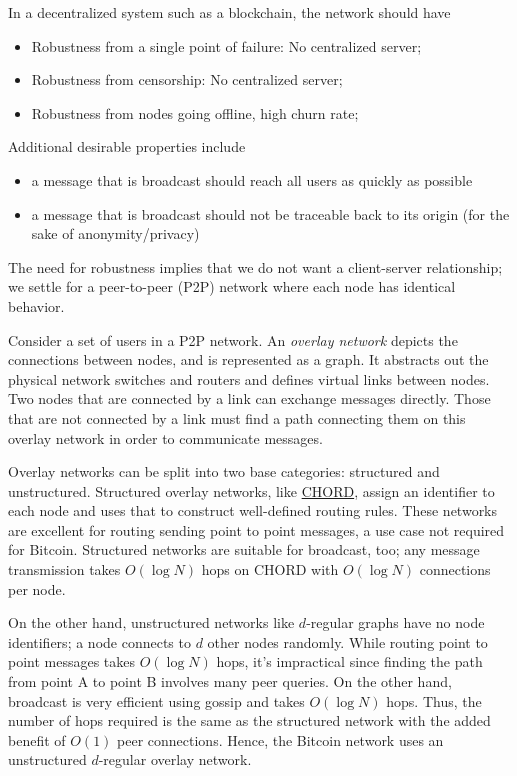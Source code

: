 \documentclass{article}
\begin{document}
In a decentralized system such as a blockchain, the network should have
\begin{itemize}
    \item Robustness from a single point of failure: No centralized server;  
    \item Robustness from censorship: No centralized server; 
    \item Robustness from nodes going offline, high churn rate; 
\end{itemize}
Additional desirable properties include
\begin{itemize}
    \item a message that is broadcast should reach all users as quickly as possible
    \item a message that is broadcast should not be traceable back to its origin (for the sake of anonymity/privacy)
\end{itemize}
The need for robustness implies that we do not want a client-server relationship; we settle for a peer-to-peer (P2P) network where each node has identical behavior.

Consider a set of users in a P2P network. An \textit{overlay network} depicts the connections between nodes, and is represented as a graph. It abstracts out the physical network switches and routers and defines virtual links between nodes. Two nodes that are connected by a link can exchange messages directly. Those that are not connected by a link must find a path connecting them on this overlay network in order to communicate messages.

Overlay networks can be split into two base categories: structured and unstructured. Structured overlay networks, like \href{https://en.wikipedia.org/wiki/Chord_(peer-to-peer)}{CHORD}, assign an identifier to each node and uses that to construct well-defined routing rules. These networks are excellent for routing sending point to point messages, a use case not required for Bitcoin. Structured networks are suitable for broadcast, too; any message transmission takes $O(\log N)$ hops on CHORD with $O(\log N)$ connections per node.

On the other hand, unstructured networks like $d$-regular graphs have no node identifiers; a node connects to $d$ other nodes randomly. While routing point to point messages takes $O(\log N)$ hops, it's impractical since finding the path from point A to point B involves many peer queries. On the other hand, broadcast is very efficient using gossip and takes $O(\log N)$ hops. Thus, the number of hops required is the same as the structured network with the added benefit of $O(1)$ peer connections. Hence, the Bitcoin network uses an unstructured $d$-regular overlay network. 
\end{document}
